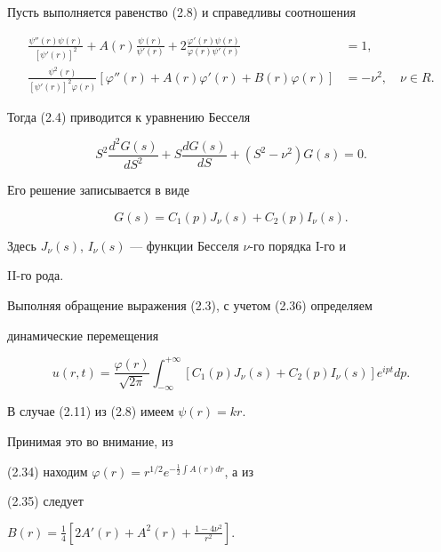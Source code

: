 \begin{case} 


Пусть выполняется равенство (2.8) и справедливы соотношения 


\begin{align} 


\frac{\psi''(r)\psi(r)}{[\psi'(r)]^2}+A(r) 


\frac{\psi(r)}{\psi'(r)}+ 


2\frac{\varphi'(r)\psi(r)}{\varphi(r)\psi'(r)}&=1, \\ 


\frac{\psi^2(r)}{[\psi'(r)]^2\varphi(r)} 


[\varphi''(r)+A(r)\varphi'(r)+B(r)\varphi(r)]&=-\nu^2,\quad \nu\in R. 


\end{align} 


Тогда (2.4) приводится к уравнению Бесселя 


$$ 


S^2\frac{d^2G(s)}{dS^2}+S\frac{d G(s)}{dS}+ 


(S^2-\nu^2)G(s)=0. 


$$ 


Его решение записывается в виде 


\begin{equation} 


G(s)=C_1(p)J_\nu(s)+C_2(p)I_\nu(s). 


\end{equation} 


Здесь $J_\nu(s)$, $I_\nu(s)$ --- функции Бесселя $\nu$-го порядка I-го и 


II-го рода. 


 


Выполняя обращение выражения (2.3), с учетом (2.36) определяем 


динамические перемещения 


\begin{equation} 


u(r,t)=\frac{\varphi(r)}{\sqrt{2\pi}}\int^{+\infty}_{-\infty} 


[C_1(p)J_\nu(s)+C_2(p)I_\nu(s)]e^{ipt}dp. 


\end{equation} 


В случае (2.11) из (2.8) имеем $\psi(r)=kr$. 


Принимая это во внимание, из 


(2.34) находим $\varphi(r)=r^{1/2}e^{-\frac{1}{2}\int A(r)dr}$, а из 


(2.35) следует 


$B(r)=\frac{1}{4}\left[2A'(r)+A^2(r)+ 


\frac{1-4\nu^2}{r^2}\right]$. 


\end{case} 


